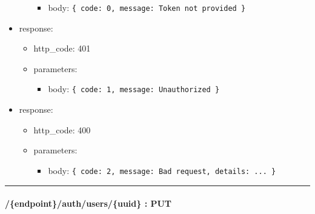 \documentclass[
]{article}
\begin{document}
\begin{itemize}
\begin{itemize}
    \begin{itemize}
    \item
      body: \texttt{\{
      \textquotesingle{}code\textquotesingle{}:\ 0,\ 
      \textquotesingle{}message\textquotesingle{}:\ \textquotesingle{}Token\ not\ provided\textquotesingle{}
      \}}
    \end{itemize}
  \end{itemize}
\item
  response:

  \begin{itemize}
  \item
    http\_code: 401
  \item
    parameters:

    \begin{itemize}
    \item
      body: \texttt{\{
      \textquotesingle{}code\textquotesingle{}:\ 1,\ 
      \textquotesingle{}message\textquotesingle{}:\ \textquotesingle{}Unauthorized\textquotesingle{}
      \}}
    \end{itemize}
  \end{itemize}
\item
  response:

  \begin{itemize}
  \item
    http\_code: 400
  \item
    parameters:

    \begin{itemize}
    \item
      body: \texttt{\{
      \textquotesingle{}code\textquotesingle{}:\ 2,
      \textquotesingle{}message\textquotesingle{}:\ \textquotesingle{}Bad\ request\textquotesingle{},
      \textquotesingle{}details\textquotesingle{}:\ \textquotesingle{}...\textquotesingle{}
      \}}
    \end{itemize}
  \end{itemize}
\end{itemize}

\begin{center}\rule{0.5\linewidth}{0.5pt}\end{center}

\hypertarget{header-n60863}{%
\paragraph{/\{endpoint\}/auth/users/\{uuid\} :
PUT}\label{header-n60863}}
\end{document}
